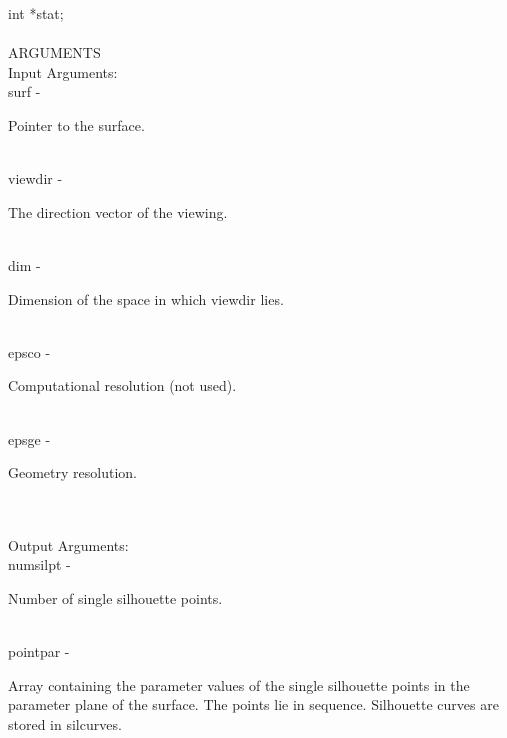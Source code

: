                 \>\>    int     \>      *{\fov stat};\\
\\
ARGUMENTS\\
        \>Input Arguments:\\
        \>\>    {\fov surf}\> - \>              \begin{minipg2}
                                Pointer to the surface.
                                \end{minipg2}\\
        \>\>    {\fov viewdir}\> - \>   \begin{minipg2}
                                The direction vector of the viewing.
                                \end{minipg2}\\
        \>\>    {\fov dim}\> - \>       \begin{minipg2}
                                Dimension of the space in which {\fov viewdir} lies.
                                \end{minipg2}\\
        \>\>    {\fov epsco}\> - \>     \begin{minipg2}
                                Computational resolution (not used).
                                \end{minipg2}\\
        \>\>    {\fov epsge}\> - \>     \begin{minipg2}
                                Geometry resolution.
                                \end{minipg2}\\
\\
        \>Output Arguments:\\
        \>\>    {\fov numsilpt}\> - \>  \begin{minipg2}
                                Number of single silhouette points.
                                \end{minipg2}\\
        \>\>    {\fov pointpar}\> - \>  \begin{minipg2}
                                Array containing the parameter values of the
                                single silhouette points in the parameter plane of
                                the surface. The points lie in sequence. Silhouette
                                curves are stored in silcurves.
                                \end{minipg2}\\[0.8ex]

